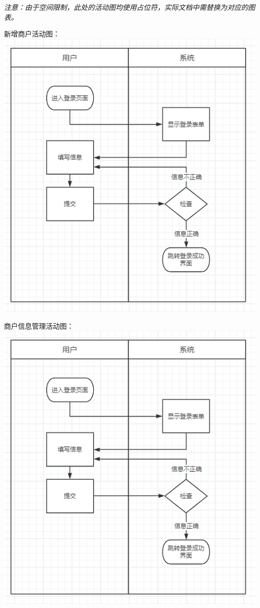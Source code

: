 \documentclass[]{article}
\begin{document}
\textit{注意：由于空间限制，此处的活动图均使用占位符，实际文档中需替换为对应的图表。}

新增商户活动图：
\includegraphics{media/media/image1.png}

商户信息管理活动图：
\includegraphics{media/media/image1.png}
\end{document}
